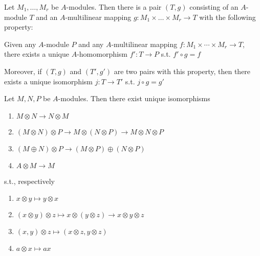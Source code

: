 \documentclass[11pt]{article}
\begin{document}
\begin{proposition}[]
Let \(M_1,\dots,M_r\) be \(A\)-modules. Then there is a pair \((T,g)\) consisting of
an \(A\)-module \(T\) and an \(A\)-multilinear mapping \(g:M_1\times\dots\times M_r\to T\) with the following
property:

Given any \(A\)-module \(P\) and any \(A\)-multilinear mapping \(f:M_1\times\cdots\times M_r\to T\), there exists a
unique \(A\)-homomorphism \(f':T\to P\) s.t. \(f'\circ g=f\)

Moreover, if \((T,g)\) and \((T',g')\) are two pairs with this property, then there exists a
unique isomorphism \(j:T\to T'\) s.t. \(j\circ g=g'\)
\end{proposition}

\begin{proposition}[]
Let \(M,N,P\) be \(A\)-modules. Then there exist unique isomorphisms
\begin{enumerate}
\item \(M\otimes N\to N\otimes M\)
\item \((M\otimes N)\otimes P\to M\otimes(N\otimes P)\to M\otimes N\otimes P\)
\item \((M\oplus N)\otimes P\to(M\otimes P)\oplus(N\otimes P)\)
\item \(A\otimes M\to M\)
\end{enumerate}


s.t., respectively
\begin{enumerate}
\item \(x\otimes y\mapsto y\otimes x\)
\item \((x\otimes y)\otimes z\mapsto x\otimes(y\otimes z)\to x\otimes y\otimes z\)
\item \((x,y)\otimes z\mapsto(x\otimes z,y\otimes z)\)
\item \(a\otimes x\mapsto ax\)
\end{enumerate}
\end{proposition}
\end{document}
